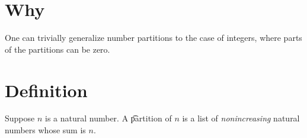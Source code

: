 
\section*{Why}

One can trivially generalize number partitions to the case of integers, where parts of the partitions can be zero.

\section*{Definition}

Suppose $n$ is a natural number.
A \t{partition} of $n$ is a list of \textit{nonincreasing} natural numbers whose sum is $n$.

\blankpage